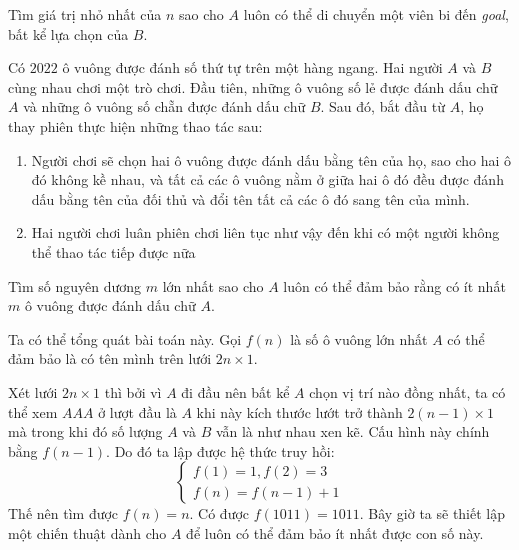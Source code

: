 \documentclass[11pt]{scrartcl}
\begin{document}
\begin{itemize}[label=, leftmargin=0em, itemsep=0.5em]
\begin{btvn}
\begin{enumerate}
        \end{enumerate}
        
        Tìm giá trị nhỏ nhất của $n$ sao cho $A$ luôn có thể di chuyển một viên bi đến \textit{goal}, bất kể lựa chọn của $B$.
    \end{btvn}

    \begin{bt}
        Có $2022$ ô vuông được đánh số thứ tự trên một hàng ngang. Hai người $A$ và $B$ cùng nhau chơi một trò chơi. Đầu tiên, những ô vuông số lẻ được đánh dấu chữ $A$ và những ô vuông số chẵn được đánh dấu chữ $B$. Sau đó, bắt đầu từ $A$, họ thay phiên thực hiện những thao tác sau:
        \begin{enumerate}
            \item Người chơi sẽ chọn hai ô vuông được đánh dấu bằng tên của họ, sao cho hai ô đó không kề nhau, và tất cả các ô vuông nằm ở giữa hai ô đó đều được đánh dấu bằng tên của đối thủ và đổi tên tất cả các ô đó sang tên của mình.
            \item Hai người chơi luân phiên chơi liên tục như vậy đến khi có một người không thể thao tác tiếp được nữa
        \end{enumerate}
        Tìm số nguyên dương $m$ lớn nhất sao cho $A$ luôn có thể đảm bảo rằng có ít nhất $m$ ô vuông được đánh dấu chữ $A$.
    \end{bt}

    \begin{sol}
        Ta có thể tổng quát bài toán này. Gọi $f(n)$ là số ô vuông lớn nhất $A$ có thể đảm bảo là có tên mình trên lưới $2n \times 1$.


        Xét lưới $2n \times 1$ thì bởi vì $A$ đi đầu nên bất kể $A$ chọn vị trí nào đồng nhất, ta có thể xem $AAA$ ở lượt đầu là $A$ khi này kích thước lướt trở thành $2(n - 1) \times 1$ mà trong khi đó số lượng $A$ và $B$ vẫn là như nhau xen kẽ. Cấu hình này chính bằng $f(n - 1)$. Do đó ta lập được hệ thức truy hồi:
        \[
            \left\{
                \begin{array}{l}
                    f(1) = 1, f(2) = 3\\
                    f(n) = f(n - 1) + 1
                \end{array}
            \right.
        \]
        Thế nên tìm được $f(n) = n$. Có được $f(1011) = 1011$. Bây giờ ta sẽ thiết lập một chiến thuật dành cho $A$ để luôn có thể đảm bảo ít nhất được con số này. 



\end{sol}
\end{itemize}
\end{document}
